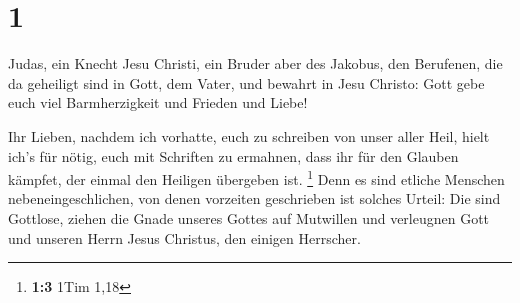 \hypertarget{section}{%
\section{1}\label{section}}

 Judas, ein Knecht Jesu Christi, ein Bruder aber des
Jakobus, den Berufenen, die da geheiligt sind in Gott, dem Vater, und
bewahrt in Jesu Christo:  Gott gebe euch viel
Barmherzigkeit und Frieden und Liebe!

 Ihr Lieben, nachdem ich vorhatte, euch zu schreiben von
unser aller Heil, hielt ich's für nötig, euch mit Schriften zu ermahnen,
dass ihr für den Glauben kämpfet, der einmal den Heiligen übergeben ist.
\footnote{\textbf{1:3} 1Tim 1,18}  Denn es sind etliche
Menschen nebeneingeschlichen, von denen vorzeiten geschrieben ist
solches Urteil: Die sind Gottlose, ziehen die Gnade unseres Gottes auf
Mutwillen und verleugnen Gott und unseren Herrn Jesus Christus, den
einigen Herrscher.

